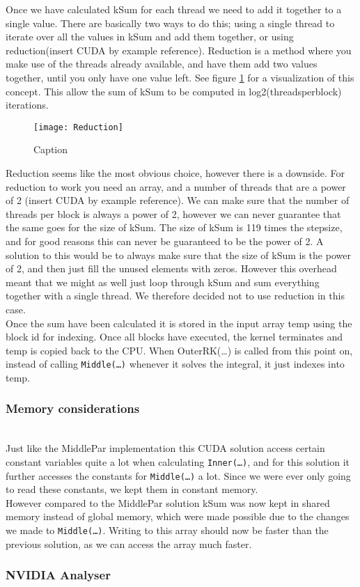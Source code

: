 Once we have calculated kSum for each thread we need to add it together to a single value. There are basically two ways to do this; using a single thread to iterate over all the values in kSum and add them together, or using reduction(insert CUDA by example reference). Reduction is a method where you make use of the threads already available, and have them add two values together, until you only have one value left. See figure \ref{fig:reduction} for a visualization of this concept. This allow the sum of kSum to be computed in log2(threadsperblock) iterations.\\

\begin{figure}[ht!]
  \centering
    \texttt{[image: Reduction]}
  \caption{Caption}
  \label{fig:reduction}
\end{figure}

Reduction seems like the most obvious choice, however there is a downside. For reduction to work you need an array, and a number of threads that are a power of 2 (insert CUDA by example reference). We can make sure that the number of threads per block is always a power of 2, however we can never guarantee that the same goes for the size of kSum. The size of kSum is 119 times the stepsize, and for good reasons this can never be guaranteed to be the power of 2. A solution to this would be to always make sure that the size of kSum is the power of 2, and then just fill the unused elements with zeros. However this overhead meant that we might as well just loop through kSum and sum everything together with a single thread. We therefore decided not to use reduction in this case.\\

Once the sum have been calculated it is stored in the input array temp using the block id for indexing. Once all blocks have executed, the kernel terminates and temp is copied back to the CPU. When OuterRK(…) is called from this point on, instead of calling \texttt{Middle(…)} whenever it solves the integral, it just indexes into temp.

\subsubsection{Memory considerations} \hfill \\
Just like the MiddlePar implementation this CUDA solution access certain constant variables quite a lot when calculating \texttt{Inner(…)}, and for this solution it further accesses the constants for \texttt{Middle(…)} a lot. Since we were ever only going to read these constants, we kept them in constant memory.\\

However compared to the MiddlePar solution kSum was now kept in shared memory instead of global memory, which were made possible due to the changes we made to \texttt{Middle(…)}. Writing to this array should now be faster than the previous solution, as we can access the array much faster.

\subsubsection{NVIDIA Analyser} \hfill \\